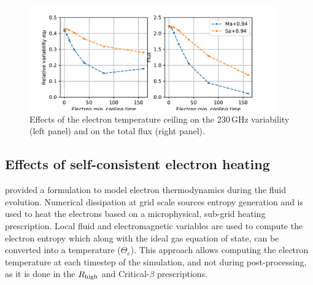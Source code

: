 \begin{figure}
  \centering
  \includegraphics[width=0.95\textwidth]{figures/ctcut_effects.pdf}
  \caption{Effects of the electron temperature ceiling on the 230\,GHz variability (left panel) and on the total flux (right panel).}
  \label{fig:ceiling_lc2}
\end{figure}





\subsection{Effects of self-consistent electron heating}


\citealt{10.1093/mnras/stv2084} provided a formulation to model electron thermodynamics during the fluid evolution. Numerical dissipation at grid scale sources entropy generation and is used to heat the electrons based on a microphysical, sub-grid heating prescription. Local fluid and electromagnetic variables are used to compute the electron entropy which along with the ideal gas equation of state, can be converted into a temperature ($\Theta_{e}$). This approach allows computing the electron temperature at each timestep of the simulation, and not during post-processing, as it is done in the $R_\mathrm{high}$ and Critical-$\beta$ prescriptions.

